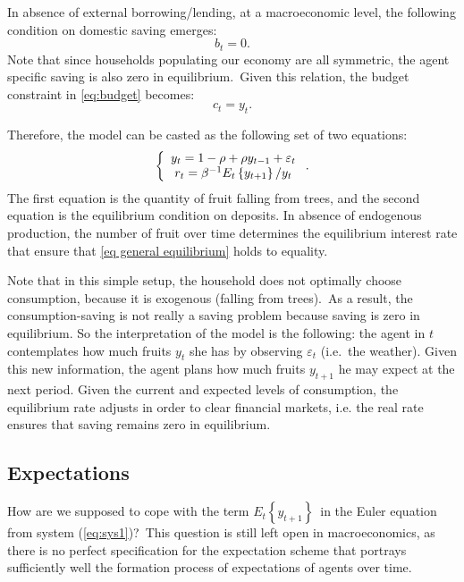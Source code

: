 \documentclass[a4paper,12pt]{article}%
\begin{document}
In absence of external borrowing/lending, at a macroeconomic level, the
following condition on domestic saving emerges:%
\begin{equation}
b_{t}=0. \label{eq general equilibrium}%
\end{equation}
Note that since households populating our economy are all symmetric, the agent
specific saving is also zero in equilibrium.\ Given this relation, the budget
constraint in \autoref{eq:budget} becomes:%
\begin{equation}
c_{t}=y_{t}.
\end{equation}


Therefore, the model can be casted as the following set of two equations:%
\begin{equation}
\left\{
\begin{array}
[c]{c}%
y_{t}=1-\rho+\rho y_{t-1}+\varepsilon_{t}\\
r_{t}=\beta^{-1}E_{t}\left\{  y_{t+1}\right\}  /y_{t}%
\end{array}
\right.  . \label{eq:sys1}%
\end{equation}
The first equation is the quantity of fruit falling from trees, and the second
equation is the equilibrium condition on deposits. In absence of endogenous
production, the number of fruit over time determines the equilibrium interest
rate that ensure that \autoref{eq general equilibrium} holds to equality.

Note that in this simple setup, the household does not optimally choose
consumption, because it is exogenous (falling from trees).\ As a result, the
consumption-saving is not really a saving problem because saving is zero in
equilibrium. So the interpretation of the model is the following: the agent in
$t$ contemplates how much fruits $y_{t}$ she has by observing $\varepsilon
_{t}$ (i.e.\ the weather). Given this new information, the agent plans how
much fruits $y_{t+1}$ he may expect at the next period. Given the current and
expected levels of consumption, the equilibrium rate adjusts in order to clear
financial markets, i.e. the real rate ensures that saving remains zero in equilibrium.

\subsection{Expectations}

How are we supposed to cope with the term $E_{t}\left\{  y_{t+1}\right\}
$\ in the Euler equation from system (\ref{eq:sys1})?\ This question is still
left open in macroeconomics, as there is no perfect specification for the
expectation scheme that portrays sufficiently well the formation process of
expectations of agents over time.
\end{document}
